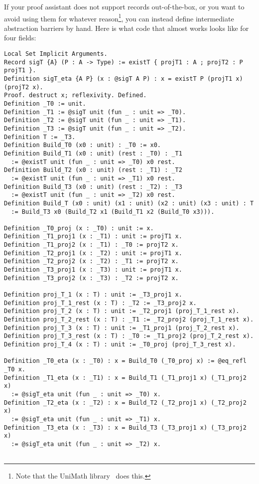   If your proof assistant does not support records out-of-the-box, or you want to avoid using them for whatever reason\footnote{Note that the UniMath library~\cite{voevodsky_2015,UniMath,introduction2018Grayson} does this. }, you can instead define intermediate abstraction barriers by hand.
  Here is what code that almost works looks like for four fields:
\begin{verbatim}
Local Set Implicit Arguments.
Record sigT {A} (P : A -> Type) := existT { projT1 : A ; projT2 : P projT1 }.
Definition sigT_eta {A P} (x : @sigT A P) : x = existT P (projT1 x) (projT2 x).
Proof. destruct x; reflexivity. Defined.
Definition _T0 := unit.
Definition _T1 := @sigT unit (fun _ : unit => _T0).
Definition _T2 := @sigT unit (fun _ : unit => _T1).
Definition _T3 := @sigT unit (fun _ : unit => _T2).
Definition T := _T3.
Definition Build_T0 (x0 : unit) : _T0 := x0.
Definition Build_T1 (x0 : unit) (rest : _T0) : _T1
  := @existT unit (fun _ : unit => _T0) x0 rest.
Definition Build_T2 (x0 : unit) (rest : _T1) : _T2
  := @existT unit (fun _ : unit => _T1) x0 rest.
Definition Build_T3 (x0 : unit) (rest : _T2) : _T3
  := @existT unit (fun _ : unit => _T2) x0 rest.
Definition Build_T (x0 : unit) (x1 : unit) (x2 : unit) (x3 : unit) : T
  := Build_T3 x0 (Build_T2 x1 (Build_T1 x2 (Build_T0 x3))).

Definition _T0_proj (x : _T0) : unit := x.
Definition _T1_proj1 (x : _T1) : unit := projT1 x.
Definition _T1_proj2 (x : _T1) : _T0 := projT2 x.
Definition _T2_proj1 (x : _T2) : unit := projT1 x.
Definition _T2_proj2 (x : _T2) : _T1 := projT2 x.
Definition _T3_proj1 (x : _T3) : unit := projT1 x.
Definition _T3_proj2 (x : _T3) : _T2 := projT2 x.

Definition proj_T_1 (x : T) : unit := _T3_proj1 x.
Definition proj_T_1_rest (x : T) : _T2 := _T3_proj2 x.
Definition proj_T_2 (x : T) : unit := _T2_proj1 (proj_T_1_rest x).
Definition proj_T_2_rest (x : T) : _T1 := _T2_proj2 (proj_T_1_rest x).
Definition proj_T_3 (x : T) : unit := _T1_proj1 (proj_T_2_rest x).
Definition proj_T_3_rest (x : T) : _T0 := _T1_proj2 (proj_T_2_rest x).
Definition proj_T_4 (x : T) : unit := _T0_proj (proj_T_3_rest x).

Definition _T0_eta (x : _T0) : x = Build_T0 (_T0_proj x) := @eq_refl _T0 x.
Definition _T1_eta (x : _T1) : x = Build_T1 (_T1_proj1 x) (_T1_proj2 x)
  := @sigT_eta unit (fun _ : unit => _T0) x.
Definition _T2_eta (x : _T2) : x = Build_T2 (_T2_proj1 x) (_T2_proj2 x)
  := @sigT_eta unit (fun _ : unit => _T1) x.
Definition _T3_eta (x : _T3) : x = Build_T3 (_T3_proj1 x) (_T3_proj2 x)
  := @sigT_eta unit (fun _ : unit => _T2) x.


\end{verbatim}
